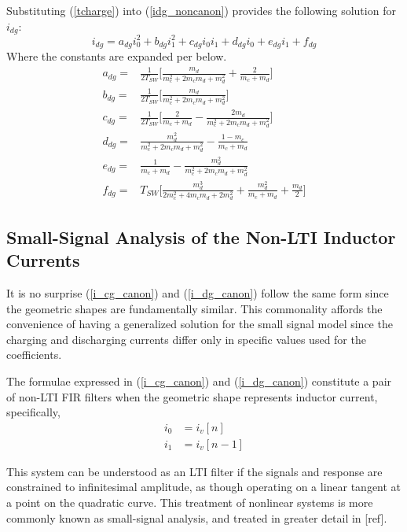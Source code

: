 \documentclass[conference]{IEEEtran}
\begin{document}
Substituting (\ref{tcharge}) into (\ref{idg_noncanon}) provides the following solution for \(i_{dg}\):
\begin{equation}
i_{dg} = a_{dg}i_0^2+b_{dg}i_1^2+c_{dg}i_0i_1+d_{dg}i_0+e_{dg}i_1+f_{dg} \label{i_dg_canon}
\end{equation}
Where the constants are expanded per below.
\begin{align*}
a_{dg} = & \frac{1}{2T_{SW}} \bigg [ \frac{m_d}{m_c^2+2m_cm_d+m_d^2}+\frac{2}{m_c+m_d} \bigg ] \nonumber\\
b_{dg} = & \frac{1}{2T_{SW}} \bigg [ \frac{m_d}{m_c^2+2m_cm_d+m_d^2} \bigg ] \nonumber\\
c_{dg} = & \frac{1}{2T_{SW}} \bigg [ \frac{2}{m_c+m_d}-\frac{2m_d}{m_c^2+2m_cm_d+m_d^2} \bigg ]\nonumber\\
d_{dg} = & \frac{m_d^2}{m_c^2+2m_cm_d+m_d^2}-\frac{1-m_c}{m_c+m_d}\nonumber\\
e_{dg} = & \frac{1}{m_c+m_d}-\frac{m_d^2}{m_c^2+2m_cm_d+m_d^2}\nonumber\\
f_{dg} = & T_{SW} \bigg [ \frac{m_d^3}{2m_c^2+4m_cm_d+2m_d^2}+\frac{m_d^2}{m_c+m_d}+\frac{m_d}{2} \bigg ]
\end{align*}

\subsection{Small-Signal Analysis of the Non-LTI Inductor Currents}
It is no surprise (\ref{i_cg_canon}) and (\ref{i_dg_canon}) follow the same form since the geometric shapes are fundamentally similar. This commonality affords the convenience of having a generalized solution for the small signal model since the charging and discharging currents differ only in specific values used for the coefficients.

The formulae expressed in (\ref{i_cg_canon}) and (\ref{i_dg_canon}) constitute a pair of non-LTI FIR filters when the geometric shape represents inductor current, specifically,
\begin{align}
i_0 &= i_v[n] \nonumber \\
i_1 &= i_v[n-1]
\label{i0i1ivn}
\end{align}

This system can be understood as an LTI filter if the signals and response are constrained to infinitesimal amplitude, as though operating on a linear tangent at a point on the quadratic curve. This treatment of nonlinear systems is more commonly known as small-signal analysis, and treated in greater detail in [ref].
\end{document}
